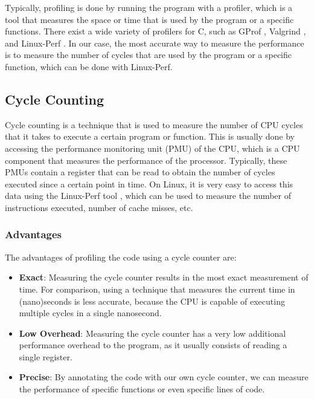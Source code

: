 \documentclass[11pt,a4paper]{report}
\theoremstyle{definition}
\begin{document}
Typically, profiling is done by running the program with a profiler, which is a tool that measures the space or time that is used by the program or a specific functions. There exist a wide variety of profilers for C, such as GProf \cite{graham1982gprof}, Valgrind \cite{nethercote2007valgrind}, and Linux-Perf \cite{de2010new}. In our case, the most accurate way to measure the performance is to measure the number of cycles that are used by the program or a specific function, which can be done with Linux-Perf.

\subsection{Cycle Counting}
Cycle counting is a technique that is used to measure the number of CPU cycles that it takes to execute a certain program or function. This is usually done by accessing the performance monitoring unit (PMU) of the CPU, which is a CPU component that measures the performance of the processor. Typically, these PMUs contain a register that can be read to obtain the number of cycles executed since a certain point in time. On Linux, it is very easy to access this data using the Linux-Perf tool \cite{de2010new}, which can be used to measure the number of instructions executed, number of cache misses, etc.

\subsubsection{Advantages}
The advantages of profiling the code using a cycle counter are:
\begin{itemize}
  \item \textbf{Exact}: Measuring the cycle counter results in the most exact measurement of time. For comparison, using a technique that measures the current time in (nano)seconds is less accurate, because the CPU is capable of executing multiple cycles in a single nanosecond.
  \item \textbf{Low Overhead}: Measuring the cycle counter has a very low additional performance overhead to the program, as it usually consists of reading a single register.
  \item \textbf{Precise}: By annotating the code with our own cycle counter, we can measure the performance of specific functions or even specific lines of code.
\end{itemize}
\end{document}
